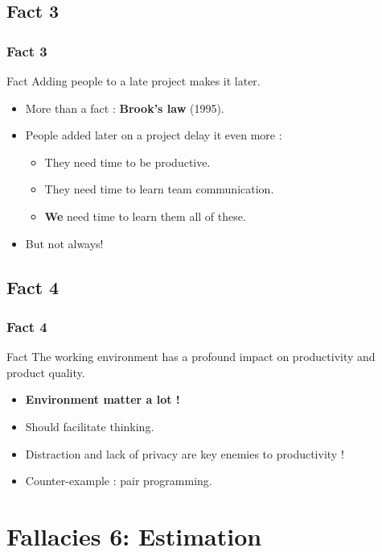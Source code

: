 \documentclass{beamer}
\begin{document}
\subsection{Fact 3}
\begin{frame}
    \frametitle{Fact 3}
    \begin{block}{Fact}
    Adding people to a late project makes it later.
    \end{block}
    \begin{itemize}
     \pause
     \item More than a fact : \textbf{Brook's law} (1995).
     \pause
     \item People added later on a project delay it even more :
     \pause
     \begin{itemize}
      \item They need time to be productive.
      \pause
      \item They need time to learn team communication.
      \pause
      \item \textbf{We} need time to learn them all of these.
     \end{itemize}
     \pause
     \item But not always!
    \end{itemize}

\end{frame}

\subsection{Fact 4}
\begin{frame}
    \frametitle{Fact 4}
    \begin{block}{Fact}
    The working environment has a profound impact on productivity and product
    quality.
    \end{block}
    \begin{itemize}
     \pause
     \item \textbf{Environment matter a lot !}
     \pause
     \item Should facilitate thinking.
     \pause
     \item Distraction and lack of privacy are key enemies to productivity !
     \pause
     \item Counter-example : pair programming.
    \end{itemize}

\end{frame}

\section{Fallacies 6: Estimation}
\end{document}
